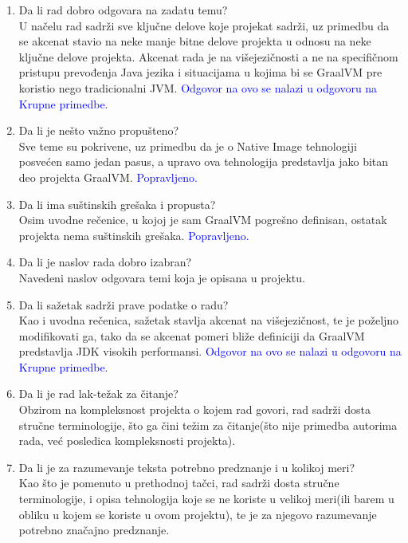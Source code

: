 \documentclass[a4paper]{report}
\newcommand{\odgovor}[1]{\textcolor{blue}{#1}}
\begin{document}
\begin{enumerate}
\item Da li rad dobro odgovara na zadatu temu?\\
U načelu rad sadrži sve ključne delove koje projekat sadrži, uz primedbu da se akcenat stavio na neke manje bitne delove projekta u odnosu na 
neke ključne delove projekta. Akcenat rada je na višejezičnosti a ne na specifičnom pristupu prevođenja Java jezika i situacijama u kojima bi 
se GraalVM pre koristio nego tradicionalni JVM. 
\odgovor{Odgovor na ovo se nalazi u odgovoru na Krupne primedbe.}

\item Da li je nešto važno propušteno?\\
Sve teme su pokrivene, uz primedbu da je o Native Image tehnologiji posvećen samo jedan pasus, a upravo ova tehnologija predstavlja jako bitan 
deo projekta GraalVM. \odgovor{Popravljeno.}

\item Da li ima suštinskih grešaka i propusta?\\
Osim uvodne rečenice, u kojoj je sam GraalVM pogrešno definisan, ostatak projekta nema suštinskih grešaka. \odgovor{Popravljeno.}

\item Da li je naslov rada dobro izabran?\\
Navedeni naslov odgovara temi koja je opisana u projektu.

\item Da li sažetak sadrži prave podatke o radu?\\
Kao i uvodna rečenica, sažetak stavlja akcenat na višejezičnost, te je poželjno modifikovati ga, tako da se akcenat pomeri bliže definiciji da 
GraalVM predstavlja JDK visokih performansi. \odgovor{Odgovor na ovo se nalazi u odgovoru na Krupne primedbe.}

\item Da li je rad lak-težak za čitanje?\\
Obzirom na kompleksnost projekta o kojem rad govori, rad sadrži dosta stručne terminologije, što ga čini težim za čitanje(što nije primedba 
autorima rada, već posledica kompleksnosti projekta).

\item Da li je za razumevanje teksta potrebno predznanje i u kolikoj meri?\\
Kao što je pomenuto u prethodnoj tačci, rad sadrži dosta stručne terminologije, i opisa tehnologija koje se ne koriste u velikoj meri(ili barem 
u obliku u kojem se koriste u ovom projektu), te je za njegovo razumevanje potrebno značajno predznanje.


\end{enumerate}
\end{document}

